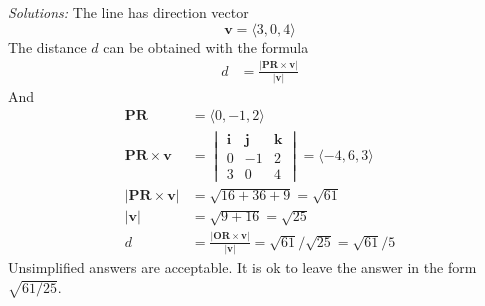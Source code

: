 \begin{parts}
    \ifnum {} {\color{DarkBlue} \textit{Solutions:} 
    The line has direction vector 
    $$\mathbf v = \langle 3,0,4\rangle$$
    The distance $d$ can be obtained with the formula 
    \begin{align}
        d &= \frac{|\mathbf{PR}\times \mathbf v|}{|\mathbf v|}
    \end{align}
    And 
    \begin{align}
        \mathbf{PR} &= \langle 0,-1,2 \rangle \\
        \mathbf{PR} \times \mathbf v 
        &= \begin{vmatrix} \mathbf i&\mathbf j&\mathbf k \\ 0&-1&2 \\ 3&0&4\end{vmatrix} 
        = \langle -4,6,3\rangle\\
        |\mathbf{PR}\times \mathbf v| &= \sqrt{16+36+9} = \sqrt{61}\\
        |\mathbf v| &= \sqrt{9+16} = \sqrt{25}\\
        d &= \frac{|\mathbf{OR}\times \mathbf v|}{|\mathbf v|} = \sqrt{ 61 }/\sqrt{25} = \sqrt{61}/5
    \end{align}
        Unsimplified answers are acceptable. It is ok to leave the answer in the form $\sqrt{61/25}$.
    } 
    \else
    \vspace{4cm}
    \fi       
\end{parts}

\fi    
